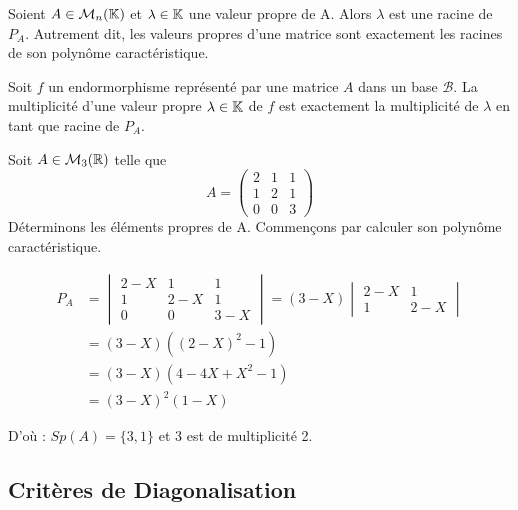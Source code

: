\begin{prop}
    Soient $A \in \mathcal{M}_n(\mathbb{K})$ et $\lambda \in \mathbb{K}$ une valeur propre de A. 
    Alors $\lambda$ est une racine de $P_A$. 
    Autrement dit, les valeurs propres d'une matrice sont exactement les racines de son polynôme caractéristique. 
\end{prop}

\begin{definition}[Multiplicité]
    Soit $f$ un endormorphisme représenté par une matrice $A$ dans un base $\mathcal{B}$. 
    La multiplicité d'une valeur propre $\lambda \in \mathbb{K}$ de $f$ est exactement la multiplicité de $\lambda$ en tant que racine de $P_A$.     
\end{definition}

\begin{example}
    Soit $A \in \mathcal{M}_3(\mathbb{R})$ telle que 
    \[A = 
        \begin{pmatrix}
            2 & 1 & 1 \\ 
            1 & 2 & 1 \\ 
            0 & 0 & 3
        \end{pmatrix}
    \]
    Déterminons les éléments propres de A. Commençons par calculer son polynôme caractéristique. 

    \begin{align*}
        P_A &=  \begin{vmatrix}
                    2-X & 1 & 1 \\ 
                    1 & 2-X & 1 \\ 
                    0 & 0 & 3-X 
                \end{vmatrix}
            = (3-X)    \begin{vmatrix}
                            2-X & 1  \\ 
                            1 & 2-X
                        \end{vmatrix} \\ 
            &= (3-X)((2-X)^2-1) \\
            &= (3-X)(4 - 4X + X^2 - 1) \\
            &= (3-X)^2(1-X)
    \end{align*}

    D'où : $Sp(A) = \{3,1\}$ et 3 est de multiplicité 2. 
\end{example}


\subsection{Critères de Diagonalisation}

